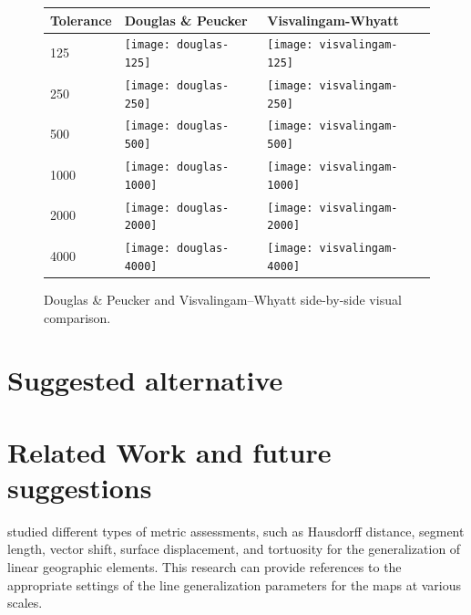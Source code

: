 \documentclass[a4paper]{article}
\newcommand{\DP}{Douglas \& Peucker}
\newcommand{\VW}{Visvalingam--Whyatt}
\begin{document}
\begin{figure}[h]
    \renewcommand{\tabularxcolumn}[1]{>{\center\small}m{#1}}
    \begin{tabularx}{\textwidth}{ p{1.5cm} | X | X | }
        Tolerance                                                 &
        Douglas \& Peucker                                        &
        Visvalingam-Whyatt                                        \tabularnewline \hline

        125                                                       &
        \texttt{[image: douglas-125]}           &
        \texttt{[image: visvalingam-125]}       \tabularnewline \hline

        250                                                       &
        \texttt{[image: douglas-250]}         &
        \texttt{[image: visvalingam-250]}     \tabularnewline \hline

        500                                                       &
        \texttt{[image: douglas-500]}        &
        \texttt{[image: visvalingam-500]}    \tabularnewline \hline

        1000                                                      &
        \texttt{[image: douglas-1000]}      &
        \texttt{[image: visvalingam-1000]}  \tabularnewline \hline

        2000                                                      &
        \texttt{[image: douglas-2000]}     &
        \texttt{[image: visvalingam-2000]} \tabularnewline \hline

        4000                                                      &
        \texttt{[image: douglas-4000]}     &
        \texttt{[image: visvalingam-4000]} \tabularnewline \hline
    \end{tabularx}
    \label{tab:dp-vs-vw}
    \caption{{\DP} and {\VW} side-by-side visual comparison.}
\end{figure}

\section{Suggested alternative}
\label{sec:my_idea}

\section{Related Work and future suggestions}
\label{sec:related_work}

\cite{stanislawski2012automated} studied different types of metric assessments,
such as Hausdorff distance, segment length, vector shift, surface displacement,
and tortuosity for the generalization of linear geographic elements. This
research can provide references to the appropriate settings of the line
generalization parameters for the maps at various scales.
\end{document}
